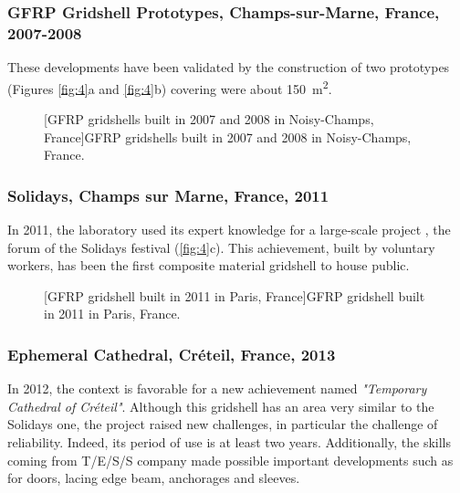 \subsubsection{GFRP Gridshell Prototypes, Champs-sur-Marne, France, 2007-2008}
These developments have been validated by the construction of two prototypes (Figures \ref{fig:4}a and \ref{fig:4}b) covering were about \SI{150}{m^2}.
\begin{figure}[h]
		\hspace*{\fill}
		\vspace{10pt}
		[GFRP gridshells built in 2007 and 2008 in Noisy-Champs, France]{GFRP gridshells built in 2007 and 2008 in Noisy-Champs, France.}
		\label{fig:proto}    
\end{figure}

\subsubsection{Solidays, Champs sur Marne, France, 2011}
In 2011, the laboratory used its expert knowledge for a large-scale project \cite{Baverel2012}, the forum of the Solidays festival (\autoref{fig:4}c). This achievement, built by voluntary workers, has been the first composite material gridshell to house public.
\begin{figure}[h]
		\hspace*{\fill}
		\vspace{10pt}
		[GFRP gridshell built in 2011 in Paris, France]{GFRP gridshell built in 2011 in Paris, France.}
		\label{fig:solidays}    
\end{figure}

\subsubsection{Ephemeral Cathedral, Créteil, France, 2013}

In 2012, the context is favorable for a new achievement named \emph{"Temporary Cathedral of Créteil"}. Although this gridshell has an area very similar to the Solidays one, the project raised new challenges, in particular the challenge of reliability. Indeed, its period of use is at least two years. Additionally, the skills coming from T/E/S/S company made possible important developments such as for doors, lacing edge beam, anchorages and sleeves.

